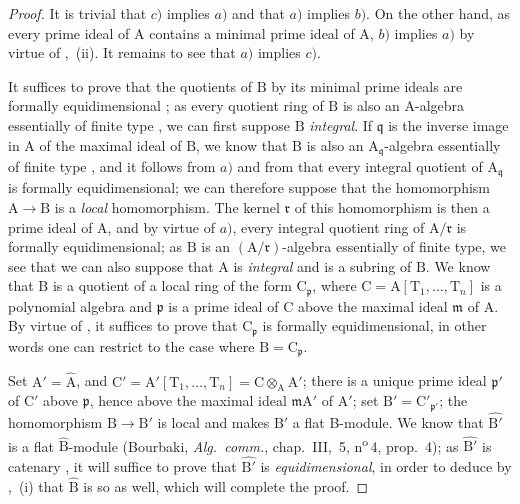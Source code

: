 \begin{proof}
It is trivial that $c)$ implies $a)$ and that $a)$ implies $b)$.
On the other hand, as every prime ideal of $\mathrm{A}$ contains a minimal prime ideal of $\mathrm{A}$, $b)$ implies $a)$ by virtue of ,~(ii).
It remains to see that $a)$ implies $c)$.

It suffices to prove that the quotients of $\mathrm{B}$ by its minimal prime ideals are formally equidimensional ; as every quotient ring of $\mathrm{B}$ is also an A-algebra essentially of finite type , we can first suppose $\mathrm{B}$ \emph{integral}.
If $\mathfrak{q}$ is the inverse image in $\mathrm{A}$ of the maximal ideal of $\mathrm{B}$, we know that $\mathrm{B}$ is also an $\mathrm{A}_\mathfrak{q}$-algebra essentially of finite type , and it follows from $a)$ and from  that every integral quotient of $\mathrm{A}_\mathfrak{q}$ is formally equidimensional; we can therefore suppose that the homomorphism $\mathrm{A}\to\mathrm{B}$ is a \emph{local} homomorphism.
The kernel $\mathfrak{r}$ of this homomorphism is then a prime ideal of $\mathrm{A}$, and by virtue of $a)$, every integral quotient ring of $\mathrm{A}/\mathfrak{r}$ is formally equidimensional; as $\mathrm{B}$ is an $(\mathrm{A}/\mathfrak{r})$-algebra essentially of finite type, we see that we can also suppose
that $\mathrm{A}$ is \emph{integral} and is a subring of $\mathrm{B}$.
We know  that $\mathrm{B}$ is a quotient of a local ring of the form $\mathrm{C}_\mathfrak{p}$, where $\mathrm{C}=\mathrm{A}[\mathrm{T}_1,\ldots,\mathrm{T}_n]$ is a polynomial algebra and $\mathfrak{p}$ is a prime ideal of $\mathrm{C}$ above the maximal ideal $\mathfrak{m}$ of $\mathrm{A}$.
By virtue of , it suffices to prove that $\mathrm{C}_\mathfrak{p}$ is formally equidimensional, in other words one can restrict to the case where $\mathrm{B}=\mathrm{C}_\mathfrak{p}$.

Set $\mathrm{A}'=\widehat{\mathrm{A}}$, and $\mathrm{C}'=\mathrm{A}'[\mathrm{T}_1,\ldots,\mathrm{T}_n]=\mathrm{C}\otimes_\mathrm{A}\mathrm{A}'$; there is a unique prime ideal $\mathfrak{p}'$ of $\mathrm{C}'$ above $\mathfrak{p}$, hence above the maximal ideal $\mathfrak{m}\mathrm{A}'$ of $\mathrm{A}'$; set $\mathrm{B}'=\mathrm{C}'_{\mathfrak{p}'}$; the homomorphism $\mathrm{B}\to\mathrm{B}'$ is local and makes $\mathrm{B}'$ a flat B-module.
We know that $\widehat{\mathrm{B}'}$ is a flat $\widehat{\mathrm{B}}$-module (Bourbaki, \emph{Alg.\ comm.}, chap.~III, \textsection\,5, n\textsuperscript{o}\,4, prop.~4); as $\widehat{\mathrm{B}'}$ is catenary , it will suffice to prove that $\widehat{\mathrm{B}'}$ is \emph{equidimensional}, in order to deduce by ,~(i) that $\widehat{\mathrm{B}}$ is so as well, which will complete the proof.


\end{proof}
